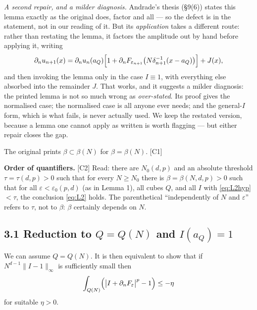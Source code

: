 \documentclass[11pt,reqno]{amsart}
\theoremstyle{plain}
\theoremstyle{definition}
\theoremstyle{plain}
\theoremstyle{definition}
\theoremstyle{remark}
\newcommand{\nd}{\partial_n}
\newcommand{\Ledger}[1]{{\scriptsize\textsf{[#1]}}}
\begin{document}
\begin{filled}
\smallskip
\emph{A second repair, and a milder diagnosis.} Andrade's thesis (\S9(6)) states this
lemma exactly as the original does, factor and all --- so the defect is in the
statement, not in our reading of it. But its \emph{application} takes a different
route: rather than restating the lemma, it factors the amplitude out by hand before
applying it, writing
\[\nd u_{n+1}(x)=\nd u_n(a_Q)\Bigl[1+\nd F_{\varepsilon_{n+1}}
   \bigl(N\delta_{n+1}^{-1}(x-a_Q)\bigr)\Bigr]+J(x),\]
and then invoking the lemma only in the case $I\equiv1$, with everything else absorbed
into the remainder $J$. That works, and it suggests a milder diagnosis: the printed
lemma is not so much wrong as \emph{over-stated}. Its proof gives the normalised case;
the normalised case is all anyone ever needs; and the general-$I$ form, which is what
fails, is never actually used. We keep the restated version, because a lemma one
cannot apply as written is worth flagging --- but either repair closes the gap.
\end{filled}

\begin{ournotation}
The original prints $\beta\subset\beta(N)$ for $\beta=\beta(N)$. \Ledger{C1}
\end{ournotation}

\begin{filled}
\textbf{Order of quantifiers.} \Ledger{C2} Read: there are $N_0(d,p)$ and an
absolute threshold $\tau=\tau(d,p)>0$ such that for every $N\ge N_0$ there is
$\beta=\beta(N,d,p)>0$ such that for all $\varepsilon<\varepsilon_0(p,d)$ (as in
Lemma 1), all cubes $Q$, and all $I$ with \eqref{eq:L2hyp} $<\tau$, the conclusion
\eqref{eq:L2} holds. The parenthetical ``independently of $N$ and $\varepsilon$''
refers to $\tau$, not to $\beta$: $\beta$ certainly depends on $N$.
\end{filled}

\subsection*{3.1 Reduction to $Q=Q(N)$ and $I(a_Q)=1$}

We can assume $Q=Q(N)$. It is then equivalent to show that if $N^{d-1}\|I-1\|_\infty$
is sufficiently small then
\begin{equation}\label{eq:L2red}
 \int_{Q(N)}\Bigl(\bigl|I+\nd F_\varepsilon\bigr|^p-1\Bigr)\le-\eta
\end{equation}
for suitable $\eta>0$.
\end{document}
